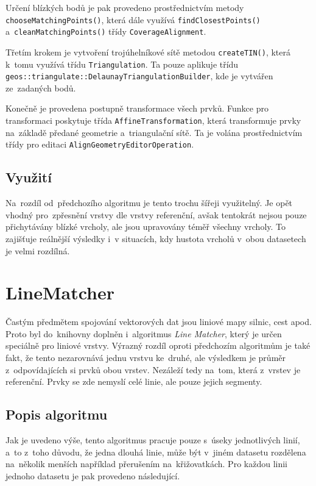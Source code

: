 Určení blízkých bodů je pak provedeno prostřednictvím metody 
\texttt{choose\-Matching\-Points()}, která dále využívá
\texttt{find\-Closest\-Points()} a~\texttt{clean\-Matching\-Points()} 
třídy \texttt{Coverage\-Alignment}.

Třetím krokem je vytvoření trojúhelníkové sítě metodou
\texttt{create\-TIN()}, která k~tomu využívá třídu 
\texttt{Tri\-an\-gu\-la\-tion}.  Ta pouze aplikuje třídu 
\texttt{geos::triangu\-late::Delaunay\-Triangulation\-Builder}, kde je 
vytvářen  ze~zadaných bodů.

Konečně je provedena postupně transformace všech prvků. Funkce pro
transformaci poskytuje třída \texttt{Affine\-Trans\-for\-mation},
která transformuje prvky na~základě předané geometrie a~triangulační
sítě. Ta je volána prostřednictvím třídy pro editaci 
\texttt{Align\-Geo\-metry\-Edi\-tor\-Ope\-ra\-tion}.


\subsection{Využití}
\label{ca-vyuziti}

Na~rozdíl od~předchozího algoritmu je tento trochu šířeji využitelný. Je opět 
vhodný pro~zpřesnění vrstvy dle vrstvy referenční, avšak tentokrát nejsou 
pouze přichytávány blízké vrcholy, ale jsou upravovány téměř všechny vrcholy. 
To zajišťuje reálnější výsledky i~v situacích, kdy hustota vrcholů v~obou 
datasetech je velmi rozdílná.


\section{LineMatcher}
\label{line matcher}

Častým předmětem spojování vektorových dat jsou liniové mapy silnic, cest apod.
Proto byl do~knihovny doplněn i~algoritmus \textit{Line Matcher}, který je
určen speciálně pro liniové vrstvy. Výrazný rozdíl oproti předchozím algoritmům
je také fakt, že tento nezarovnává jednu vrstvu ke~druhé, ale výsledkem je
průměr z~odpovídajících si prvků obou vrstev. Nezáleží tedy na~tom, která 
z~vrstev je referenční. Prvky se zde nemyslí celé linie, ale pouze jejich
segmenty.

\subsection{Popis algoritmu}
\label{lm-algoritmus}

Jak je uvedeno výše, tento algoritmus pracuje pouze s~úseky jednotlivých
linií, a~to z~toho důvodu, že jedna dlouhá linie, může být v~jiném datasetu
rozdělena na~několik menších například přerušením na~křižovatkách. Pro každou
linii jednoho datasetu je pak provedeno následující. 

